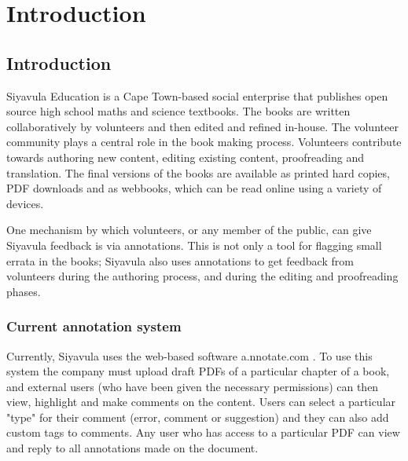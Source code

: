 
\chapter{Introduction} %

\label{Chapter1} %



\section{Introduction}
Siyavula Education is a Cape Town-based social enterprise that publishes open source high school maths and science textbooks. The books are written collaboratively by volunteers and then edited and refined in-house. The volunteer community plays a central role in the book making process. Volunteers contribute towards authoring new content, editing existing content, proofreading and translation. The final versions of the books are available as printed hard copies, PDF downloads and as webbooks, which can be read online using a variety of devices. 

One mechanism by which volunteers, or any member of the public, can give Siyavula feedback is via annotations. This is not only a tool for flagging small errata in the books; Siyavula also uses annotations to get feedback from volunteers during the authoring process, and during the editing and proofreading phases.


\subsection{Current annotation system}

Currently, Siyavula uses the web-based software a.nnotate.com \citep{AnnotateCom}. To use this system the company must upload draft PDFs of a particular chapter of a book, and external users (who have been given the necessary permissions) can then view, highlight and make comments on the content. Users can select a particular "type" for their comment (error, comment or suggestion) and they can also add custom tags to comments. Any user who has access to a particular PDF can view and reply to all annotations made on the document. 

